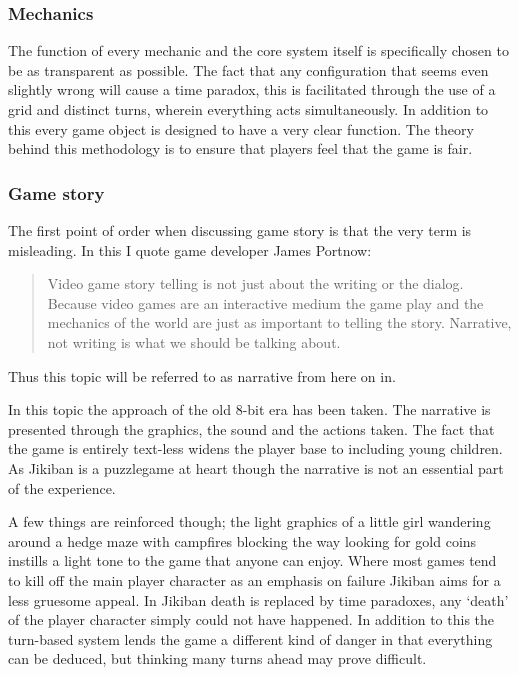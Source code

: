 \subsubsection{Mechanics}
The function of every mechanic and the core system itself is
specifically chosen to be as transparent as possible. The fact that
any configuration that seems even slightly wrong will cause a time
paradox, this is facilitated through the use of a grid and distinct
turns, wherein everything acts simultaneously. In addition to this
every game object is designed to have a very clear function. The
theory behind this methodology is to ensure that players feel that the
game is fair.

\subsubsection{Game story}
The first point of order when discussing game story is that the very
term is misleading. In this I quote game developer James Portnow:

\begin{quotation}
Video game story telling is not just about the writing or the
dialog. Because video games are an interactive medium the game play
and the mechanics of the world are just as important to telling the
story. Narrative, not writing is what we should be talking about.
\end{quotation}

Thus this topic will be referred to as narrative from here on in.

In this topic the approach of the old 8-bit era has been taken. The
narrative is presented through the graphics, the sound and the actions
taken. The fact that the game is entirely text-less widens the player
base to including young children. As Jikiban is a puzzlegame at heart
though the narrative is not an essential part of the experience.

A few things are reinforced though; the light graphics of a little
girl wandering around a hedge maze with campfires blocking the way
looking for gold coins instills a light tone to the game that anyone
can enjoy.  Where most games tend to kill off the main player
character as an emphasis on failure Jikiban aims for a less gruesome
appeal. In Jikiban death is replaced by time paradoxes, any ‘death’ of
the player character simply could not have happened. In addition to
this the turn-based system lends the game a different kind of danger
in that everything can be deduced, but thinking many turns ahead may
prove difficult.

